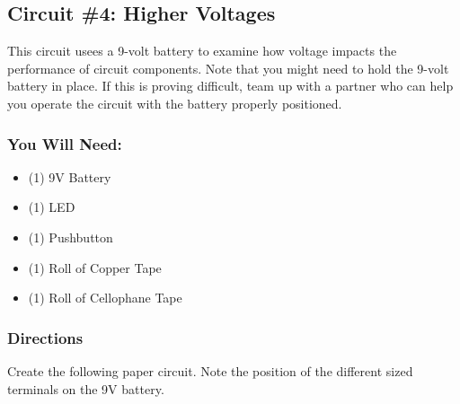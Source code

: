     \subsection{Circuit \#4: Higher Voltages}
    This circuit usees a 9-volt battery to examine how voltage impacts the performance of circuit components. Note that you might need to hold the 9-volt battery in place. If this is proving difficult, team up with a partner who can help you operate the circuit with the battery properly positioned.

    \subsubsection*{You Will Need:}
    \begin{itemize}[noitemsep]\small
        \item (1) 9V Battery
        \item (1) LED
        \item (1) Pushbutton
        \item (1) Roll of Copper Tape
        \item (1) Roll of Cellophane Tape
    \end{itemize}

    \subsubsection*{Directions}
    Create the following paper circuit. Note the position of the different sized terminals on the 9V battery.

